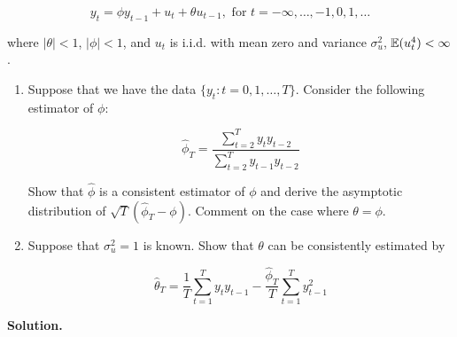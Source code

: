 \[
y_t = \phi y_{t-1} + u_t + \theta u_{t-1}, \text{ for } t = - \infty, \ldots, -1, 0 , 1, \ldots
\]

where \(|\theta| < 1\), \(|\phi| < 1\), and \(u_t\) is i.i.d. with mean zero and variance \(\sigma_u^2\), \(\E(u_t^4) < \infty\).

\begin{enumerate}[(1)]

\item Suppose that we have the data \(\{y_t : t = 0, 1, \ldots, T\} \). Consider the following estimator of \(\phi\):

\[
\hat{\phi}_T = \frac{\sum_{t=2}^T y_t y_{t-2}}{\sum_{t=2}^T y_{t-1} y_{t-2}}
\]

Show that \(\hat{\phi}\) is a consistent estimator of \(\phi\) and derive the asymptotic distribution of \(\sqrt{T}(\hat{\phi}_T - \phi)\). Comment on the case where \(\theta = \phi\).

\item Suppose that \(\sigma_u^2 = 1\) is known. Show that \(\theta\) can be consistently estimated by 

\[
\hat{\theta}_T = \frac{1}{T} \sum_{t=1}^T y_t y_{t-1} - \frac{\hat{\phi}_T}{T}\sum_{t=1}^T y_{t-1}^2
\]

\end{enumerate}

\textbf{Solution.}


